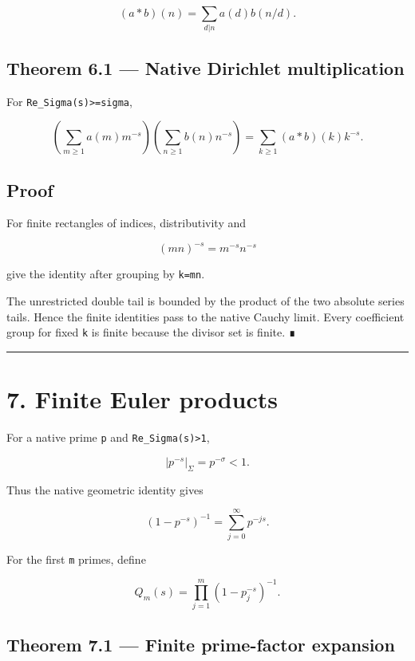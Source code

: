 \[
(a*b)(n)
=
\sum_{d|n}a(d)b(n/d).
\]

\hypertarget{theorem-6.1-native-dirichlet-multiplication}{%
\subsection{Theorem 6.1 --- Native Dirichlet multiplication}\label{theorem-6.1-native-dirichlet-multiplication}}

For \texttt{Re\_Sigma(s)\textgreater{}=sigma},

\[
\boxed{
\left(
\sum_{m\ge1}a(m)m^{-s}
\right)
\left(
\sum_{n\ge1}b(n)n^{-s}
\right)
=
\sum_{k\ge1}(a*b)(k)k^{-s}.
}
\]

\hypertarget{proof-9}{%
\subsection{Proof}\label{proof-9}}

For finite rectangles of indices, distributivity and

\[
(mn)^{-s}=m^{-s}n^{-s}
\]

give the identity after grouping by \texttt{k=mn}.

The unrestricted double tail is bounded by the product of the two absolute
series tails. Hence the finite identities pass to the native Cauchy limit.
Every coefficient group for fixed \texttt{k} is finite because the divisor set is
finite. ∎

\begin{center}\rule{0.5\linewidth}{0.5pt}\end{center}

\hypertarget{finite-euler-products}{%
\section{7. Finite Euler products}\label{finite-euler-products}}

For a native prime \texttt{p} and \texttt{Re\_Sigma(s)\textgreater{}1},

\[
|p^{-s}|_\Sigma=p^{-\sigma}<1.
\]

Thus the native geometric identity gives

\[
\boxed{
(1-p^{-s})^{-1}
=
\sum_{j=0}^{\infty}p^{-js}.
}
\]

For the first \texttt{m} primes, define

\[
Q_m(s)
=
\prod_{j=1}^{m}(1-p_j^{-s})^{-1}.
\]

\hypertarget{theorem-7.1-finite-prime-factor-expansion}{%
\subsection{Theorem 7.1 --- Finite prime-factor expansion}\label{theorem-7.1-finite-prime-factor-expansion}}

